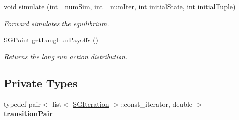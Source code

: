 \begin{DoxyCompactItemize}
\mbox{\label{classSGSimulator_ab2c60082ceca6857243a717350bec322}} 
void \hyperlink{classSGSimulator_ab2c60082ceca6857243a717350bec322}{simulate} (int \+\_\+num\+Sim, int \+\_\+num\+Iter, int initial\+State, int initial\+Tuple)
\begin{DoxyCompactList}\small\item\em Forward simulates the equilibrium. \end{DoxyCompactList}\item 
\mbox{\label{classSGSimulator_a7d46973b0ed5bc9ef7ddfeebb58e4615}} 
\hyperlink{classSGPoint}{S\+G\+Point} \hyperlink{classSGSimulator_a7d46973b0ed5bc9ef7ddfeebb58e4615}{get\+Long\+Run\+Payoffs} ()
\begin{DoxyCompactList}\small\item\em Returns the long run action distribution. \end{DoxyCompactList}\end{DoxyCompactItemize}
\subsection*{Private Types}
\begin{DoxyCompactItemize}
\item 
\mbox{\label{classSGSimulator_a1a2addd4b3694ed9435a3b598ad40392}} 
typedef pair$<$ list$<$ \hyperlink{classSGIteration}{S\+G\+Iteration} $>$\+::const\+\_\+iterator, double $>$ {\bfseries transition\+Pair}
\end{DoxyCompactItemize}
